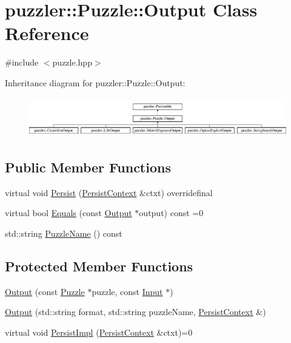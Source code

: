 \hypertarget{a00023}{}\section{puzzler\+:\+:Puzzle\+:\+:Output Class Reference}
\label{a00023}


{\ttfamily \#include $<$puzzle.\+hpp$>$}

Inheritance diagram for puzzler\+:\+:Puzzle\+:\+:Output\+:\begin{figure}[H]
\begin{center}
\leavevmode
\includegraphics[height=1.759162cm]{a00023}
\end{center}
\end{figure}
\subsection*{Public Member Functions}
\begin{DoxyCompactItemize}
\item 
virtual void \hyperlink{a00023_a7ef0d1404547bc18629c25d5b9f18622}{Persist} (\hyperlink{a00025}{Persist\+Context} \&ctxt) overridefinal
\item 
virtual bool \hyperlink{a00023_aa848aae3197c2a224d72127f0541ce7f}{Equals} (const \hyperlink{a00023}{Output} $\ast$output) const =0
\item 
std\+::string \hyperlink{a00023_adda4e5589da3217b37e87b83901d9e24}{Puzzle\+Name} () const 
\end{DoxyCompactItemize}
\subsection*{Protected Member Functions}
\begin{DoxyCompactItemize}
\item 
\hyperlink{a00023_aa605318d3632c1b359c07745bdf17e83}{Output} (const \hyperlink{a00026}{Puzzle} $\ast$puzzle, const \hyperlink{a00009}{Input} $\ast$)
\item 
\hyperlink{a00023_aca4b37a236671244977db9b169e0e9ea}{Output} (std\+::string format, std\+::string puzzle\+Name, \hyperlink{a00025}{Persist\+Context} \&)
\item 
virtual void \hyperlink{a00023_a6f38b053870861fd4afe8819174c4d3d}{Persist\+Impl} (\hyperlink{a00025}{Persist\+Context} \&ctxt)=0
\end{DoxyCompactItemize}


